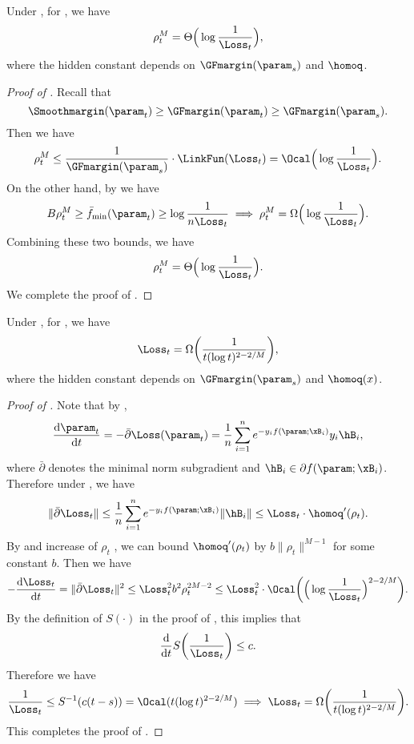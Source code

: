\begin{lemma}
\label{lem:rho-rate}
Under , for , we have 
\[
    \rho_t^M = \Theta \Big( \log \frac{1}{\Loss_t} \Big), 
\]
where the hidden constant depends on $\GFmargin(\param_s)$ and $\homoq$. 
\end{lemma}
 \begin{proof}[Proof of ]
Recall that 
 \[
    \Smoothmargin(\param_t) \ge \GFmargin(\param_t) \ge \GFmargin(\param_s). 
 \]
 Then we have 
 \[
    \rho_t^M \le \frac{1}{\GFmargin(\param_s)} \cdot \LinkFun(\Loss_t) = \Ocal \Big( \log \frac{1}{\Loss_t} \Big).
 \]
 On the other hand, by  we have
 \[
    B \rho_t^M \ge \bar f_{\min}(\param_t) \ge  \log \frac{1}{n\Loss_t} \implies \rho_t^M = \Omega \Big( \log \frac{1}{\Loss_t} \Big).
 \]
 Combining these two bounds, we have
 \[
    \rho_t^M = \Theta \Big( \log \frac{1}{\Loss_t} \Big).
 \]
We complete the proof of . 
 \end{proof}
 
 
 \begin{lemma}
 \label{lem:L-lowerbound}
 Under , for , we have
 \[
        \Loss_t = \Omega \bigg( \frac{1}{t(\log t)^{2-2/M}} \bigg), 
 \]
where the hidden constant depends on $\GFmargin(\param_s)$ and $\homoq(x)$.
 \end{lemma}
 \begin{proof}[Proof of ]
 Note that by ,
 \[
    \frac{\mathrm{d} \param_t}{\mathrm{d} t} = - \bar \partial \Loss (\param_t) = \frac{1}{n}\sum_{i=1}^n e^{-y_i f(\param;\xB_i)} y_i \hB_i,
 \]
where $\bar \partial $  denotes the minimal norm subgradient and $\hB_i \in \partial f(\param;\xB_i)$. Therefore under , we have 
 \[
    \| \bar \partial \Loss_t \| \le \frac{1}{n}\sum_{i=1}^n e^{-y_i f(\param;\xB_i)} \| \hB_i\| \le \Loss_t\cdot  \homoq^\prime (\rho_t).
 \]
By  and increase of $\rho_t$ , we can bound $\homoq^\prime (\rho_t)$ by $b \|\rho_t\|^{M-1}$ for some constant $b$. 
Then we have 
\[
    - \frac{\mathrm{d} \Loss_t}{\mathrm{d} t} = \| \bar \partial \Loss_t\|^2 \le \Loss_t^2 b^2 \rho_t^{2M-2} \le \Loss_t^2\cdot \Ocal \bigg( \Big(\log \frac{1}{\Loss_t}\Big)^{2-2/M}\bigg). 
\]
By the definition of $S(\cdot)$ in the proof of , this implies that 
\[
    \frac{\mathrm{d}}{\mathrm{d}t} S\bigg(\frac{1}{\Loss_t}\bigg)\le c. 
\]
Therefore we have 
\[
    \frac{1}{\Loss_t} \le S^{-1}(c(t-s)) = \Ocal(t(\log t)^{2-2/M})\implies \Loss_t = \Omega \bigg( \frac{1}{t(\log t)^{2-2/M}} \bigg).
\]
This completes the proof of .
 \end{proof}

